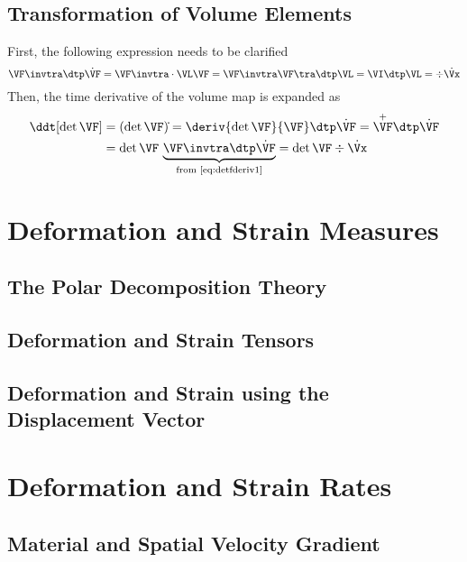 \documentclass[a5paper,twosided,11pt,DIV=15,BCOR=0mm]{scrbook}
\begin{document}
\subsection{Transformation of Volume Elements}

\begin{remark}
  First, the following expression needs to be clarified
  \begin{equation}
    \VF\invtra \dtp\dot{\VF} = \VF\invtra\cdot\VL\VF
    = \VF\invtra\VF\tra\dtp\VL = \VI\dtp\VL =\div\dot{\Vx} \label{eq:detfderiv1}
  \end{equation}
  Then, the time derivative of the volume map is expanded as
  \begin{align}
\nonumber  \ddt[\det\VF] &= (\det\VF)\dot{}= \deriv{\det\VF}{\VF}\dtp\dot{\VF}=\overset{+}{\VF}\dtp\dot{\VF}\\
    &= \det\VF \,\underbrace{\VF\invtra\dtp\dot{\VF}}_\text{from \eqref{eq:detfderiv1}}
      = \det\VF\div\dot{\Vx} \label{eq:detfderiv2}
  \end{align}
\end{remark}

\section{Deformation and Strain Measures}

\subsection{The Polar Decomposition Theory}

\subsection{Deformation and Strain Tensors}

\subsection{Deformation and Strain using the Displacement Vector}

\section{Deformation and Strain Rates}

\subsection{Material and Spatial Velocity Gradient}
\end{document}
